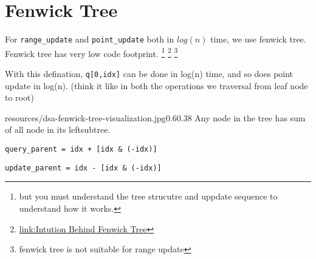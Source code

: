 \chapter{Fenwick Tree}\label{chp:fenwick_tree}

For \verb|range_update| and \verb|point_update| both in $log(n)$ time, we use fenwick tree.
Fenwick tree has very low code footprint. \footnote{but you must understand the tree strucutre and uppdate sequence to understand how it works.}
\footnote{
\href{https://cs.stackexchange.com/questions/10538/bit-what-is-the-intuition-behind-a-binary-indexed-tree-and-how-was-it-thought-a}{link:Intution Behind Fenwick Tree}}
\footnote{fenwick tree is not suitable for range update}

With this defination, \verb|q[0,idx]| can be done in log(n) time, and so does point update in log(n). (think it like in both the operations we traversal from leaf node to root)
\newpage



      



\begin{lfigure}{resources/dsa-fenwick-tree-visualization.jpg}{0.6}{0.38}
    Any node in the tree has sum of all node in its leftsubtree.
    \vspace{1cm}
    
    \verb|query_parent = idx + [idx & (-idx)]|

    \verb|update_parent = idx - [idx & (-idx)]|

\end{lfigure}
